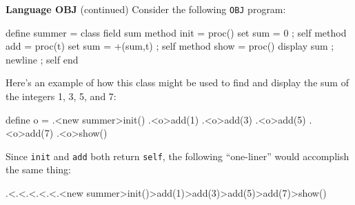 \begin{minipage}[t]{\sw}
\slidenumber
\LARGE
{\bf Language OBJ} (continued)\exx
Consider the following \verb'OBJ' program:
\Large
\begin{qv}
define summer =
  class
    field sum
    method init = proc() {set sum = 0 ; self}
    method add = proc(t) {set sum = +(sum,t) ; self}
    method show = proc() {display sum ; newline ; self}
  end
\end{qv}
\LARGE
Here's an example of how this class might be used
to find and display the sum of the integers 1, 3, 5, and 7:
\Large
\begin{qv}
define o = .<new summer>init()
.<o>add(1)
.<o>add(3)
.<o>add(5)
.<o>add(7)
.<o>show()
\end{qv}
\LARGE
Since \verb'init' and \verb'add' both return \verb'self',
the following ``one-liner'' would accomplish the same thing:
\Large
\begin{qv}
.<.<.<.<.<.<new summer>init()>add(1)>add(3)>add(5)>add(7)>show()
\end{qv}
\end{minipage}

